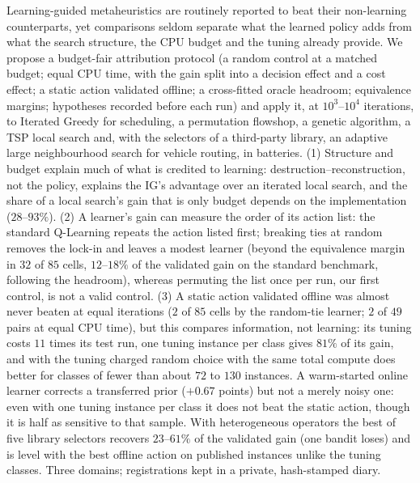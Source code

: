 Learning-guided metaheuristics are routinely reported to beat their non-learning counterparts, yet comparisons seldom separate what the learned policy adds from what the search structure, the CPU budget and the tuning already provide. We propose a budget-fair attribution protocol (a random control at a matched budget; equal CPU time, with the gain split into a decision effect and a cost effect; a static action validated offline; a cross-fitted oracle headroom; equivalence margins; hypotheses recorded before each run) and apply it, at $10^3$--$10^4$ iterations, to Iterated Greedy for scheduling, a permutation flowshop, a genetic algorithm, a TSP local search and, with the selectors of a third-party library, an adaptive large neighbourhood search for vehicle routing, in \nbatteries{} batteries. (1) Structure and budget explain much of what is credited to learning: destruction--reconstruction, not the policy, explains the IG's advantage over an iterated local search, and the share of a local search's gain that is only budget depends on the implementation ($28$--$93\%$). (2) A learner's gain can measure the order of its action list: the standard Q-Learning repeats the action listed first; breaking ties at random removes the lock-in and leaves a modest learner (beyond the equivalence margin in $32$ of $85$ cells, $12$--$18\%$ of the validated gain on the standard benchmark, following the headroom), whereas permuting the list once per run, our first control, is not a valid control. (3) A static action validated offline was almost never beaten at equal iterations ($2$ of $85$ cells by the random-tie learner; $2$ of $49$ pairs at equal CPU time), but this compares information, not learning: its tuning costs $11$ times its test run, one tuning instance per class gives $81\%$ of its gain, and with the tuning charged random choice with the same total compute does better for classes of fewer than about $72$ to $130$ instances. A warm-started online learner corrects a transferred prior ($+0.67$ points) but not a merely noisy one: even with one tuning instance per class it does not beat the static action, though it is half as sensitive to that sample. With heterogeneous operators the best of five library selectors recovers $23$--$61\%$ of the validated gain (one bandit loses) and is level with the best offline action on published instances unlike the tuning classes. Three domains; registrations kept in a private, hash-stamped diary.
